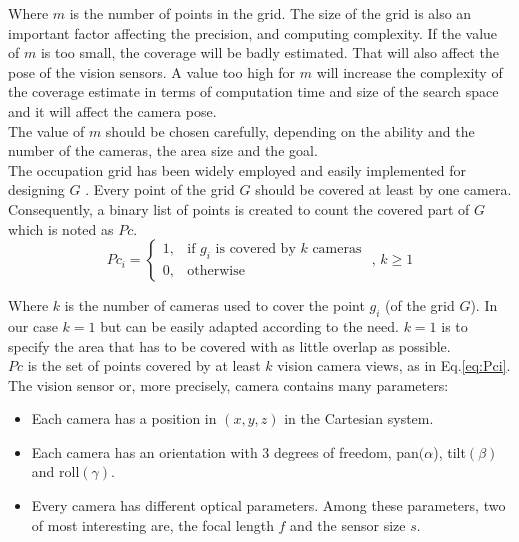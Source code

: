 \noindent Where $m$ is the number of points in the grid. The size of the grid is also an important factor affecting the precision, and computing complexity. If the value  of $m$ is too small, the coverage will be badly estimated. That will also affect the pose of the vision sensors. A value too high for $m$ will increase the complexity of the coverage estimate in terms of computation time and size of the search space and it will affect the camera pose. \\
The value of $m$ should be chosen carefully, depending on the ability and the number of the cameras, the area size and the goal. \\
The occupation grid has been widely employed and easily implemented for designing $G$  \cite{8*,137*,164*,141*,151*}.
Every point of the grid $G$ should be covered at least by one camera. Consequently, a binary list of points is created to count the covered part of $G$ which is noted as $Pc$.
\begin{equation}\label{eq:Pci}
Pc_i= \begin{cases} 1, & \mbox{if } g_i\mbox{ is covered by $k$ cameras} \\ 0, & \mbox{otherwise}  \end{cases}
 \mbox{ , }k\geq 1
\end{equation}
  


\noindent Where $k$ is the number of cameras used to cover the point $g_i$ (of the grid $G$). In our case $k=1$ but can be easily adapted according to the need. $k=1$ is to specify the area that has to be covered with as little overlap as possible.\\
$Pc$ is the set of points covered by at least $k$ vision camera views, as in Eq.\eqref{eq:Pci}. \\

The vision sensor or, more precisely, camera contains many parameters:
\begin{itemize}
\item Each camera has a position  in  $(x, y, z)$ in the Cartesian system.
\item Each camera  has an  orientation with 3 degrees of freedom, pan$(\alpha$),  tilt$(\beta)$ and roll$(\gamma)$.
\item Every camera has different optical parameters. Among these parameters, two of  most interesting are, the focal length $f$ and the sensor size $s$. 
\end{itemize}

